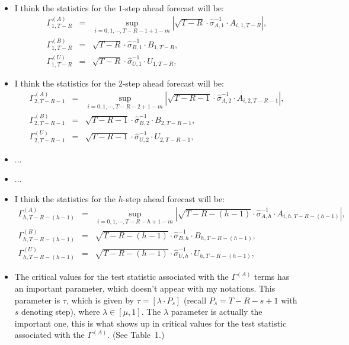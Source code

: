 \documentclass[11pt]{article}
\begin{document}
\begin{itemize}
\item I think the statistics for the $1$-step ahead forecast will be:
\begin{eqnarray}
\Gamma^{(A)}_{1,T-R}\!\!\!\!&=&\!\!\!\!\sup_{i=0,1,\cdots,T-R-1+1-m}\left|\sqrt{T-R}\cdot \widehat{\sigma}^{-1}_{A,1}\cdot A_{i,1,T-R} \right|,
\nonumber \\
\Gamma^{(B)}_{1,T-R}\!\!\!\!&=&\!\!\!\! \sqrt{T-R}\cdot\widehat{\sigma}^{-1}_{B,1}\cdot B_{1,T-R}, \nonumber \\
\Gamma^{(U)}_{1,T-R}\!\!\!\!&=&\!\!\!\! \sqrt{T-R}\cdot\widehat{\sigma}^{-1}_{U,1}\cdot U_{1,T-R}, \nonumber
\end{eqnarray}
\item I think the statistics for the $2$-step ahead forecast will be:
\begin{eqnarray}
\Gamma^{(A)}_{2,T-R-1}\!\!\!\!&=&\!\!\!\!\sup_{i=0,1,\cdots,T-R-2+1-m}\left|\sqrt{T-R-1}\cdot \widehat{\sigma}^{-1}_{A,2}\cdot A_{i,2,T-R-1} \right|,
\nonumber \\
\Gamma^{(B)}_{2,T-R-1}\!\!\!\!&=&\!\!\!\! \sqrt{T-R-1}\cdot\widehat{\sigma}^{-1}_{B,2}\cdot B_{2,T-R-1}, \nonumber \\
\Gamma^{(U)}_{2,T-R-1}\!\!\!\!&=&\!\!\!\! \sqrt{T-R-1}\cdot\widehat{\sigma}^{-1}_{U,2}\cdot U_{2,T-R-1}, \nonumber
\end{eqnarray}
\item ...
\item ... 
\item I think the statistics for the $h$-step ahead forecast will be:
\begin{eqnarray}
\Gamma^{(A)}_{h,T-R-(h-1)}\!\!\!\!&=&\!\!\!\!\sup_{i=0,1,\cdots,T-R-h+1-m}\left|\sqrt{T-R-(h-1)}\cdot \widehat{\sigma}^{-1}_{A,h}\cdot A_{i,h,T-R-(h-1)} \right|,
\nonumber \\
\Gamma^{(B)}_{h,T-R-(h-1)}\!\!\!\!&=&\!\!\!\! \sqrt{T-R-(h-1)}\cdot\widehat{\sigma}^{-1}_{B,h}\cdot B_{h,T-R-(h-1)}, \nonumber \\
\Gamma^{(U)}_{h,T-R-(h-1)}\!\!\!\!&=&\!\!\!\! \sqrt{T-R-(h-1)}\cdot\widehat{\sigma}^{-1}_{U,h}\cdot U_{h,T-R-(h-1)}, \nonumber
\end{eqnarray}
\item The critical values for the test statistic associated with the $\Gamma^{(A)}$ terms has an important parameter, which doesn't appear with my notations.  This parameter is $\tau$, which is given by $\tau=[\lambda\cdot P_{s}]$ (recall $P_{s}=T-R-s+1$ with $s$ denoting step), where $\lambda\in[\mu,1]$.  The $\lambda$ parameter is actually the important one, this is what shows up in critical values for the test statistic associated with the $\Gamma^{(A)}$.  (See Table~1.)

\end{itemize}
\end{document}
